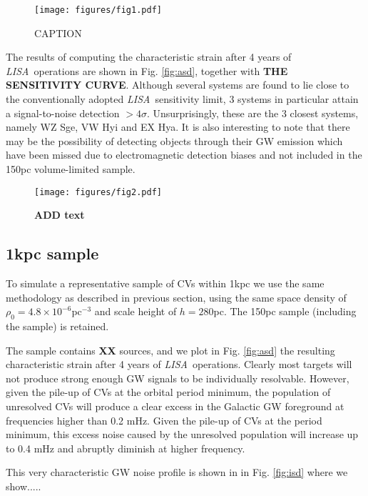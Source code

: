 \documentclass[fleqn,usenatbib]{mnras}
\newcommand{\lisa}{{\it LISA}}
\begin{document}
\begin{figure}
	\texttt{[image: figures/fig1.pdf]}
    \caption{ CAPTION   }
    \label{fig:porb}
\end{figure}

The results of computing the characteristic strain after 4 years of \lisa\ operations are shown in Fig. \ref{fig:asd}, together with \textbf{THE SENSITIVITY CURVE}. Although several systems are found to lie close to the conventionally adopted \lisa\ sensitivity limit, 3 systems in particular attain a signal-to-noise detection $>4\sigma$. Unsurprisingly, these are the 3 closest systems, namely WZ Sge, VW Hyi and EX Hya. It is also interesting to note that there may be the possibility of detecting objects through their GW emission which have been missed due to electromagnetic detection biases and not included in the 150pc volume-limited sample. 


\begin{figure}
	\texttt{[image: figures/fig2.pdf]}
    \caption{\textbf{ADD text } }
    \label{fig2.py}
\end{figure}



\subsection{1kpc sample} \label{sec:500pc}

To simulate a representative sample of CVs within 1kpc we use the same methodology as described in previous section, using the same space density of $\rho_0=4.8 \times 10^{-6}$pc$^{-3}$ and scale height of $h=280$pc. The 150pc sample (including the \cite{pala20} sample) is retained.  

The sample contains \textbf{XX} sources, and we plot in Fig. \ref{fig:asd} the resulting characteristic strain after 4 years of \lisa\ operations. Clearly most targets will not produce strong enough GW signals to be individually resolvable. However, given the pile-up of CVs at the orbital period minimum, the population of unresolved CVs will produce a clear excess in the Galactic GW foreground at frequencies higher than 0.2 mHz. Given the pile-up of CVs at the period minimum, this excess noise caused by the unresolved population will increase up to 0.4 mHz and abruptly diminish at higher frequency.

This very characteristic GW noise profile is shown in in Fig. \ref{fig:isd} where we show.....
\end{document}
